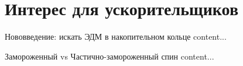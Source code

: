 \documentclass[14pt]{beamer}
\begin{document}

\section{Интерес для ускорительщиков}
\begin{frame}{Нововведение: искать ЭДМ в накопительном кольце}
	content...
\end{frame}

\begin{frame}{Замороженный vs Частично-замороженный спин}
	content...
\end{frame}
\end{document}
